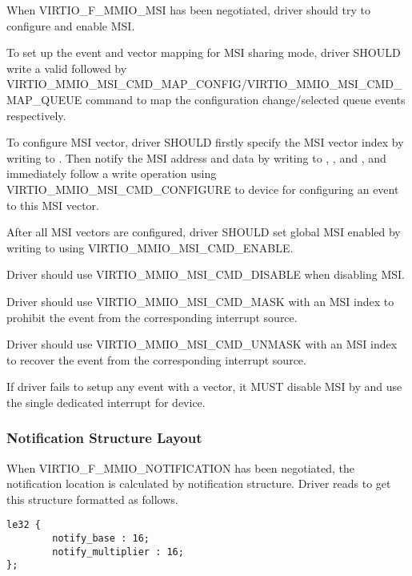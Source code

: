 When VIRTIO_F_MMIO_MSI has been negotiated, driver should try to configure
and enable MSI.

To set up the event and vector mapping for MSI sharing mode, driver SHOULD
write a valid  followed by VIRTIO_MMIO_MSI_CMD_MAP_CONFIG/VIRTIO_MMIO_MSI_CMD_MAP_QUEUE
command to map the configuration change/selected queue events respectively.

To configure MSI vector, driver SHOULD firstly specify the MSI vector index by
writing to .
Then notify the MSI address and data by writing to , ,
and , and immediately follow a  write operation
using VIRTIO_MMIO_MSI_CMD_CONFIGURE to device for configuring an event to
this MSI vector.

After all MSI vectors are configured, driver SHOULD set global MSI enabled
by writing to  using VIRTIO_MMIO_MSI_CMD_ENABLE.

Driver should use VIRTIO_MMIO_MSI_CMD_DISABLE when disabling MSI.

Driver should use VIRTIO_MMIO_MSI_CMD_MASK with an MSI index 
to prohibit the event from the corresponding interrupt source.

Driver should use VIRTIO_MMIO_MSI_CMD_UNMASK with an MSI index 
to recover the event from the corresponding interrupt source.

If driver fails to setup any event with a vector,
it MUST disable MSI by  and use the single dedicated interrupt for device.

\subsubsection{Notification Structure Layout}\label{sec:Virtio Transport Options / Virtio Over MMIO / MMIO-specific Initialization And Device Operation / Notification Structure Layout}

When VIRTIO_F_MMIO_NOTIFICATION has been negotiated, the notification location is calculated
by notification structure. Driver reads  to get this structure formatted
as follows.

\begin{lstlisting}
le32 {
        notify_base : 16;
        notify_multiplier : 16;
};
\end{lstlisting}

